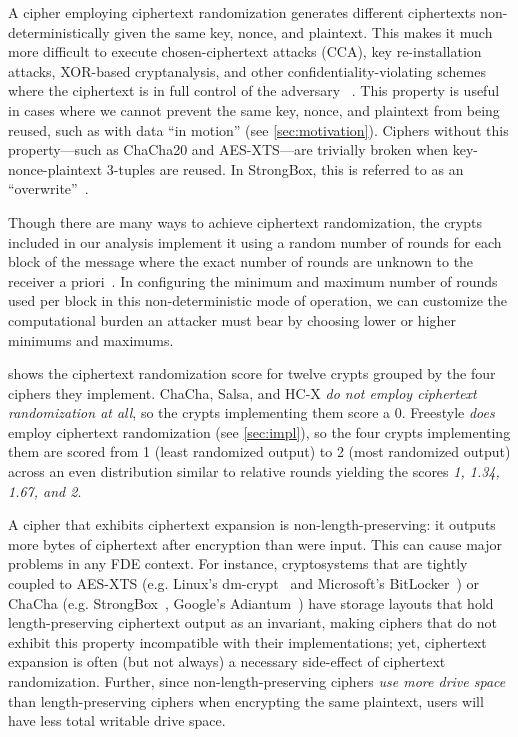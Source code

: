 
 A cipher employing
ciphertext randomization generates different ciphertexts
non-deterministically given the same key, nonce, and plaintext. This
makes it much more difficult to execute chosen-ciphertext attacks
(CCA), key re-installation attacks, XOR-based cryptanalysis, and other
confidentiality-violating schemes where the ciphertext is in full
control of the adversary ~\cite{Freestyle}. This property is useful in
cases where we cannot prevent the same key, nonce, and plaintext from
being reused, such as with data ``in motion'' (see
\cref{sec:motivation}). Ciphers without this property---such as
ChaCha20 and AES-XTS---are trivially broken when key-nonce-plaintext
3-tuples are reused. In StrongBox, this is referred to as an
``overwrite''~\cite{StrongBox}.

Though there are many ways to achieve ciphertext randomization, the crypts
included in our analysis implement it using a random number of rounds for each
block of the message where the exact number of rounds are unknown to the
receiver a priori~\cite{Freestyle}. In configuring the minimum and maximum
number of rounds used per block in this non-deterministic mode of operation, we
can customize the computational burden an attacker must bear by choosing lower
or higher minimums and maximums.

 shows the ciphertext randomization score for twelve
crypts grouped by the four ciphers they implement. ChaCha, Salsa, and
HC-X {\em do not employ ciphertext randomization at all}, so the
crypts implementing them score a 0. Freestyle {\em does} employ
ciphertext randomization (see \cref{sec:impl}), so the four crypts
implementing them are scored from 1 (least randomized output) to 2
(most randomized output) across an even distribution similar to
relative rounds yielding the scores {\em 1, 1.34, 1.67, and 2}.


 A cipher that exhibits ciphertext
expansion is non-length-preserving: it outputs more bytes of ciphertext after
encryption than were input. This can cause major problems in any FDE context.
For instance, cryptosystems that are tightly coupled to AES-XTS (e.g. Linux's
dm-crypt~\cite{dmcrypt} and Microsoft's BitLocker~\cite{bitlocker1}) or ChaCha
(e.g. StrongBox~\cite{StrongBox}, Google's Adiantum~\cite{Adiantum}) have
storage layouts that hold length-preserving ciphertext output as an invariant,
making ciphers that do not exhibit this property incompatible with their
implementations; yet, ciphertext expansion is often (but not always) a necessary
side-effect of ciphertext randomization. Further, since non-length-preserving
ciphers {\em use more drive space} than length-preserving ciphers when
encrypting the same plaintext, users will have less total writable drive space.

